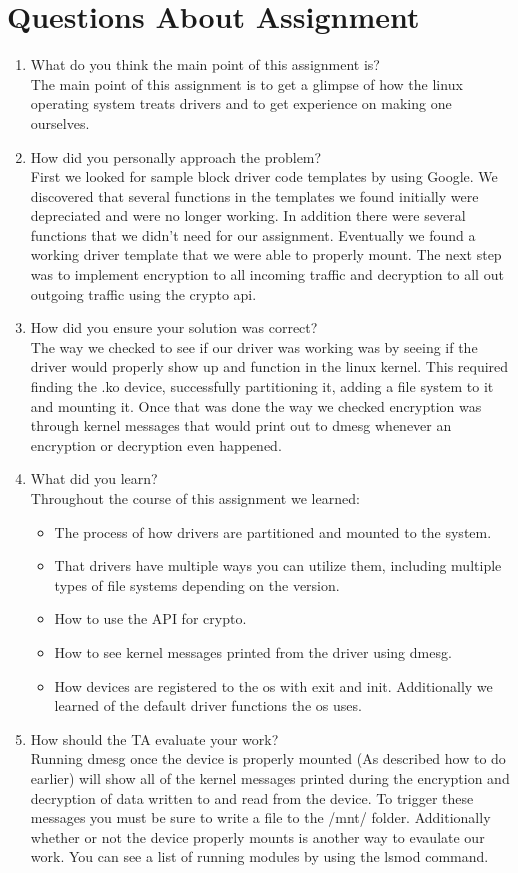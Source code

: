 \documentclass[onecolumn,draftclsnofoot, 10pt, compsoc]{IEEEtran}
\begin{document}
	
	\section{Questions About Assignment}
	\begin{enumerate}
		\item What do you think the main point of this assignment is? \\
		The main point of this assignment is to get a glimpse of how the linux operating system treats drivers and to get experience on making one ourselves.
		\item How did you personally approach the problem? \\
		First we looked for sample block driver code templates by using Google. We discovered that several functions in the templates we found initially were depreciated and were no longer working. In addition there were several functions that we didn't need for our assignment. Eventually we found a working driver template that we were able to properly mount. The next step was to implement encryption to all incoming traffic and decryption to all out outgoing traffic using the crypto api.
		\item How did you ensure your solution was correct? \\
		The way we checked to see if our driver was working was by seeing if the driver would properly show up and function in the linux kernel. This required finding the .ko device, successfully partitioning it, adding a file system to it and mounting it. Once that was done the way we checked encryption was through kernel messages that would print out to dmesg whenever an encryption or decryption even happened.
		\item What did you learn? \\
		Throughout the course of this assignment we learned:
		\begin{itemize}
			\item
			The process of how drivers are partitioned and mounted to the system.
			\item
			That drivers have multiple ways you can utilize them, including multiple types of file systems depending on the version.
			\item
			How to use the API for crypto.
			\item
			How to see kernel messages printed from the driver using dmesg.
			\item
			How devices are registered to the os with exit and init. Additionally we learned of the default driver functions the os uses.
		\end{itemize}
		\item How should the TA evaluate your work? \\
		Running dmesg once the device is properly mounted (As described how to do earlier) will show all of the kernel messages printed during the encryption and decryption of data written to and read from the device. To trigger these messages you must be sure to write a file to the /mnt/ folder.
		Additionally whether or not the device properly mounts is another way to evaulate our work. You can see a list of running modules by using the  lsmod command.
	\end{enumerate}
	
\end{document}
